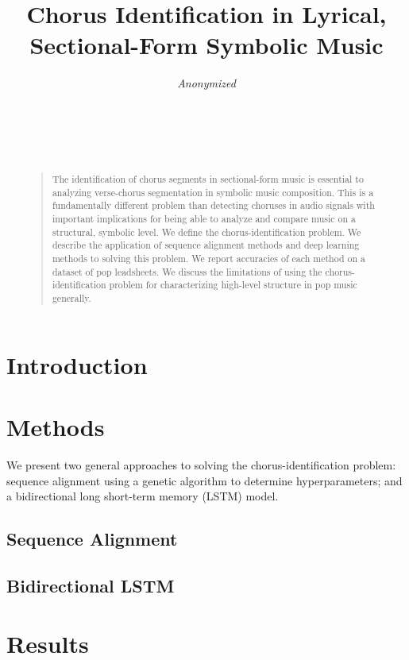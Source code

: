 \documentclass[letterpaper]{article}
\title{Chorus Identification in Lyrical, Sectional-Form Symbolic Music}
\author{\emph{Anonymized}\\
\\
\\
\\
\\}
\begin{document}
 
\maketitle
\begin{abstract}
\begin{quote}
The identification of chorus segments in sectional-form music is essential to analyzing verse-chorus segmentation in symbolic music composition. This is a fundamentally different problem than detecting choruses in audio signals with important implications for being able to analyze and compare music on a structural, symbolic level. We define the chorus-identification problem. We describe the application of sequence alignment methods and deep learning methods to solving this problem. We report accuracies of each method on a dataset of pop leadsheets. We discuss the limitations of using the chorus-identification problem for characterizing high-level structure in pop music generally.
\end{quote}
\end{abstract}

\section{Introduction}

\section{Methods}
We present two general approaches to solving the chorus-identification problem: sequence alignment using a genetic algorithm to determine hyperparameters; and a bidirectional long short-term memory (LSTM) model.

\subsection{Sequence Alignment}

\subsection{Bidirectional LSTM}

\section{Results}
\end{document}
